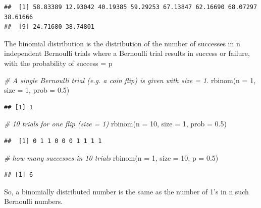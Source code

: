 \documentclass[
]{book}
\newenvironment{Shaded}{\begin{snugshade}}{\end{snugshade}}
\newcommand{\AttributeTok}[1]{\textcolor[rgb]{0.77,0.63,0.00}{#1}}
\newcommand{\CommentTok}[1]{\textcolor[rgb]{0.56,0.35,0.01}{\textit{#1}}}
\newcommand{\DecValTok}[1]{\textcolor[rgb]{0.00,0.00,0.81}{#1}}
\newcommand{\FloatTok}[1]{\textcolor[rgb]{0.00,0.00,0.81}{#1}}
\newcommand{\FunctionTok}[1]{\textcolor[rgb]{0.00,0.00,0.00}{#1}}
\newcommand{\NormalTok}[1]{#1}
\begin{document}
\begin{verbatim}
##  [1] 58.83389 12.93042 40.19385 59.29253 67.13847 62.16690 68.07297 38.61666
##  [9] 24.71680 38.74801
\end{verbatim}

The binomial distribution is the distribution of the number of successes in n independent Bernoulli trials where a Bernoulli trial results in success or failure, with the probability of success = p

\begin{Shaded}
\begin{Highlighting}[]
\CommentTok{\# A single Bernoulli trial (e.g. a coin flip) is given with size = 1.}
\FunctionTok{rbinom}\NormalTok{(}\AttributeTok{n =} \DecValTok{1}\NormalTok{, }\AttributeTok{size =} \DecValTok{1}\NormalTok{, }\AttributeTok{prob =} \FloatTok{0.5}\NormalTok{)}
\end{Highlighting}
\end{Shaded}

\begin{verbatim}
## [1] 1
\end{verbatim}

\begin{Shaded}
\begin{Highlighting}[]
\CommentTok{\# 10 trials for one flip (size = 1)}
\FunctionTok{rbinom}\NormalTok{(}\AttributeTok{n =} \DecValTok{10}\NormalTok{, }\AttributeTok{size =} \DecValTok{1}\NormalTok{, }\AttributeTok{prob =} \FloatTok{0.5}\NormalTok{)}
\end{Highlighting}
\end{Shaded}

\begin{verbatim}
##  [1] 0 1 1 0 0 0 1 1 1 1
\end{verbatim}

\begin{Shaded}
\begin{Highlighting}[]
\CommentTok{\# how many successes in 10 trials}
\FunctionTok{rbinom}\NormalTok{(}\AttributeTok{n =} \DecValTok{1}\NormalTok{, }\AttributeTok{size =} \DecValTok{10}\NormalTok{, }\AttributeTok{p =} \FloatTok{0.5}\NormalTok{)}
\end{Highlighting}
\end{Shaded}

\begin{verbatim}
## [1] 6
\end{verbatim}

So, a binomially distributed number is the same as the number of 1's in n such Bernoulli numbers.
\end{document}
